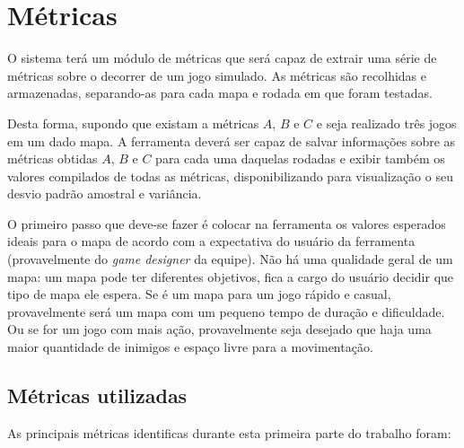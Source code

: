 \section{Métricas}

O sistema terá um módulo de métricas que será capaz de extrair uma série de métricas sobre o decorrer de um jogo simulado. 
As métricas são recolhidas e armazenadas, separando-as para cada mapa e rodada em que foram testadas. 

Desta forma, supondo que existam a métricas $A$, $B$ e $C$ e seja realizado três jogos em um dado mapa.
A ferramenta deverá ser capaz de salvar informações sobre as métricas obtidas $A$, $B$ e $C$ para cada uma daquelas rodadas e exibir também os valores compilados de todas as métricas, disponibilizando para visualização o seu desvio padrão amostral e variância.

O primeiro passo que deve-se fazer é colocar na ferramenta os valores esperados ideais para o mapa de acordo com a expectativa do usuário da ferramenta (provavelmente do \textit{game designer} da equipe). Não há uma qualidade geral de um mapa: um mapa pode ter diferentes objetivos, fica a cargo do usuário decidir que tipo de mapa ele espera. Se é um mapa para um jogo rápido e casual, provavelmente será um mapa com um pequeno tempo de duração e dificuldade. Ou se for um jogo com mais ação, provavelmente seja desejado que haja uma maior quantidade de inimigos e espaço livre para a movimentação.

\subsection{Métricas utilizadas}

As principais métricas identificas durante esta primeira parte do trabalho foram: 

